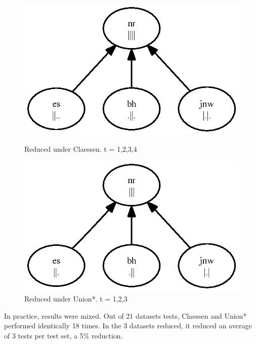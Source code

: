 \documentclass[11pt,twoside]{article}
\theoremstyle{definition}
\begin{document}
\begin{figure}

\includegraphics{toy.ps}
\caption{Reduced under Claessen. t = {1,2,3,4}}
\includegraphics{toyb.ps}
\caption{Reduced under Union*. t = {1,2,3}}
\end{figure}


In practice, results were mixed. Out of 21 datasets tests, Claessen and Union* performed identically 18 times. In the 3 datasets reduced, it reduced an average of 3 tests per test set, a 5\% reduction.
\end{document}
